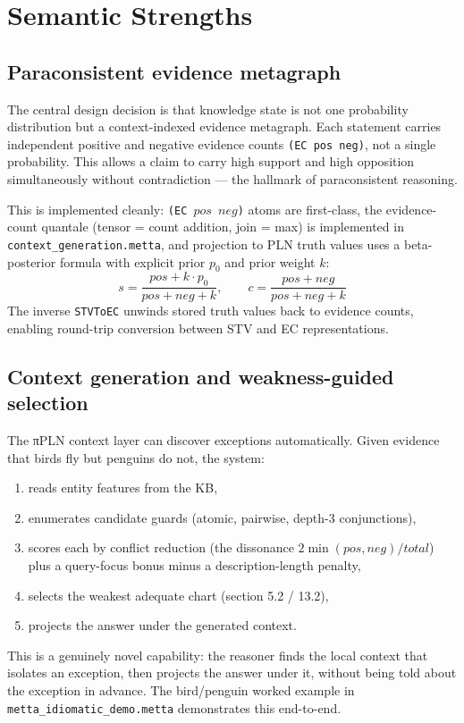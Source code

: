 \documentclass[11pt]{article}
\begin{document}
\section{Semantic Strengths}

\subsection{Paraconsistent evidence metagraph}

The central design decision is that knowledge state is not one probability
distribution but a context-indexed evidence metagraph. Each statement carries
independent positive and negative evidence counts \texttt{(EC pos neg)}, not a
single probability. This allows a claim to carry high support and high opposition
simultaneously without contradiction --- the hallmark of paraconsistent reasoning.

This is implemented cleanly: \texttt{(EC $pos$ $neg$)} atoms are first-class,
the evidence-count quantale (tensor = count addition, join = max) is implemented
in \texttt{context\_generation.metta}, and projection to PLN truth values uses a
beta-posterior formula with explicit prior $p_0$ and prior weight $k$:
\[
s = \frac{pos + k \cdot p_0}{pos + neg + k}, \qquad
c = \frac{pos + neg}{pos + neg + k}
\]
The inverse \texttt{STVToEC} unwinds stored truth values back to evidence counts,
enabling round-trip conversion between STV and EC representations.

\subsection{Context generation and weakness-guided selection}

The πPLN context layer can discover exceptions automatically. Given evidence
that birds fly but penguins do not, the system:
\begin{enumerate}[nosep]
  \item reads entity features from the KB,
  \item enumerates candidate guards (atomic, pairwise, depth-3 conjunctions),
  \item scores each by conflict reduction (the dissonance $2 \min(pos,neg)/total$)
  plus a query-focus bonus minus a description-length penalty,
  \item selects the weakest adequate chart (section 5.2 / 13.2),
  \item projects the answer under the generated context.
\end{enumerate}
This is a genuinely novel capability: the reasoner finds the local context that
isolates an exception, then projects the answer under it, without being told
about the exception in advance. The bird/penguin worked example in
\texttt{metta\_idiomatic\_demo.metta} demonstrates this end-to-end.
\end{document}

